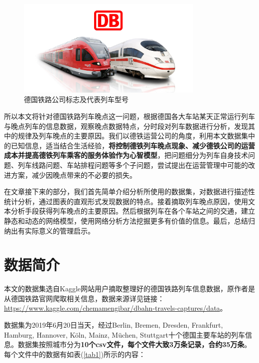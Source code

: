 \documentclass[lang=cn,12pt,a4paper,cite=authoryear]{elegantpaper}
\begin{document}
\begin{figure}[H]
	\centering
	\includegraphics[width=0.8\textwidth]{image/DB1.jpg}
	\caption{德国铁路公司标志及代表列车型号}
	\label{fig0}
\end{figure}

所以本文将针对德国铁路列车晚点这一问题，根据德国各大车站某天正常运行列车与晚点列车的信息数据，观察晚点数据特点，分时段对列车数据进行分析，发现其中的规律及列车晚点的主要原因。我们以德铁运营公司的角度，利用本文数据集中的已知信息，适当结合生活经验，\textbf{将控制德铁列车晚点现象、减少德铁公司的运营成本并提高德铁列车乘客的服务体验作为心智模型}，把问题细分为列车自身技术问题、列车线路问题、车站排程问题等多个子问题，尝试提出在运营管理中可能的改进方案，减少因晚点带来的不必要的损失。

在文章接下来的部分，我们首先简单介绍分析所使用的数据集，对数据进行描述性统计分析，通过图表的直观形式发现数据的特点。接着摘取列车晚点原因，使用文本分析手段获得列车晚点的主要原因。然后根据列车在各个车站之间的交通，建立静态和动态的网络模型，使用网络分析方法挖掘更多有价值的信息。最后，总结归纳出有实际意义的管理启示。


\section{数据简介}

本文的数据集选自Kaggle网站用户摘取整理好的德国铁路列车信息数据，原作者是从德国铁路官网爬取相关信息，数据来源详见链接：\url{https://www.kaggle.com/chemamengibar/dbahn-travels-captures/data}。

数据集为2019年6月20日当天，经过Berlin, Bremen, Dresden, Frankfurt, Hamburg, Hannover, Köln, Mainz, Müchen, Stuttgart十个德国主要车站的列车信息。数据集按照城市分为\textbf{10个csv文件，每个文件大致3万条记录，合约35万条}。每个文件中的数据有如表(\ref{tab1})所示的内容：
\end{document}
